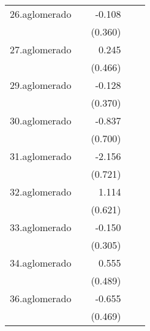 {\begin{longtable}{l*{4}{D{.}{.}{-1}}}
\addlinespace
26.aglomerado&                     &      -0.108         &                     &                     \\
            &                     &     (0.360)         &                     &                     \\
\addlinespace
27.aglomerado&                     &       0.245         &                     &                     \\
            &                     &     (0.466)         &                     &                     \\
\addlinespace
29.aglomerado&                     &      -0.128         &                     &                     \\
            &                     &     (0.370)         &                     &                     \\
\addlinespace
30.aglomerado&                     &      -0.837         &                     &                     \\
            &                     &     (0.700)         &                     &                     \\
\addlinespace
31.aglomerado&                     &      -2.156\sym{**} &                     &                     \\
            &                     &     (0.721)         &                     &                     \\
\addlinespace
32.aglomerado&                     &       1.114         &                     &                     \\
            &                     &     (0.621)         &                     &                     \\
\addlinespace
33.aglomerado&                     &      -0.150         &                     &                     \\
            &                     &     (0.305)         &                     &                     \\
\addlinespace
34.aglomerado&                     &       0.555         &                     &                     \\
            &                     &     (0.489)         &                     &                     \\
\addlinespace
36.aglomerado&                     &      -0.655         &                     &                     \\
            &                     &     (0.469)         &                     &                     \\

\end{longtable}}
